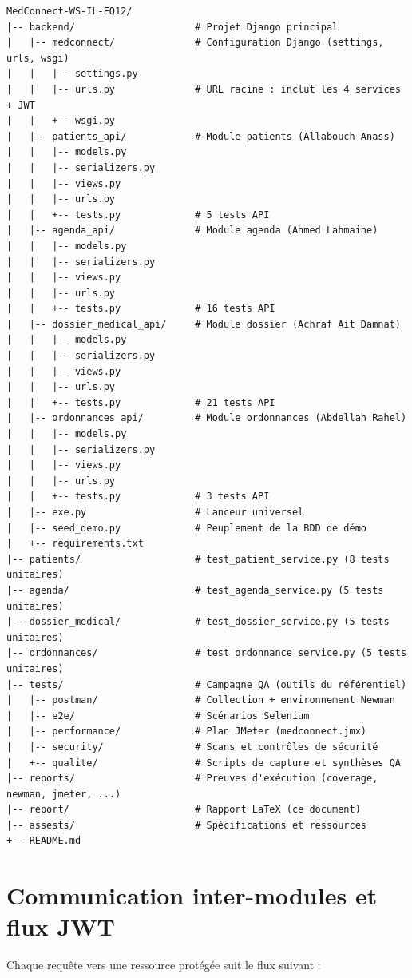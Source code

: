 \documentclass[12pt,a4paper]{report}
\begin{document}
\begin{lstlisting}
MedConnect-WS-IL-EQ12/
|-- backend/                     # Projet Django principal
|   |-- medconnect/              # Configuration Django (settings, urls, wsgi)
|   |   |-- settings.py
|   |   |-- urls.py              # URL racine : inclut les 4 services + JWT
|   |   +-- wsgi.py
|   |-- patients_api/            # Module patients (Allabouch Anass)
|   |   |-- models.py
|   |   |-- serializers.py
|   |   |-- views.py
|   |   |-- urls.py
|   |   +-- tests.py             # 5 tests API
|   |-- agenda_api/              # Module agenda (Ahmed Lahmaine)
|   |   |-- models.py
|   |   |-- serializers.py
|   |   |-- views.py
|   |   |-- urls.py
|   |   +-- tests.py             # 16 tests API
|   |-- dossier_medical_api/     # Module dossier (Achraf Ait Damnat)
|   |   |-- models.py
|   |   |-- serializers.py
|   |   |-- views.py
|   |   |-- urls.py
|   |   +-- tests.py             # 21 tests API
|   |-- ordonnances_api/         # Module ordonnances (Abdellah Rahel)
|   |   |-- models.py
|   |   |-- serializers.py
|   |   |-- views.py
|   |   |-- urls.py
|   |   +-- tests.py             # 3 tests API
|   |-- exe.py                   # Lanceur universel
|   |-- seed_demo.py             # Peuplement de la BDD de démo
|   +-- requirements.txt
|-- patients/                    # test_patient_service.py (8 tests unitaires)
|-- agenda/                      # test_agenda_service.py (5 tests unitaires)
|-- dossier_medical/             # test_dossier_service.py (5 tests unitaires)
|-- ordonnances/                 # test_ordonnance_service.py (5 tests unitaires)
|-- tests/                       # Campagne QA (outils du référentiel)
|   |-- postman/                 # Collection + environnement Newman
|   |-- e2e/                     # Scénarios Selenium
|   |-- performance/             # Plan JMeter (medconnect.jmx)
|   |-- security/                # Scans et contrôles de sécurité
|   +-- qualite/                 # Scripts de capture et synthèses QA
|-- reports/                     # Preuves d'exécution (coverage, newman, jmeter, ...)
|-- report/                      # Rapport LaTeX (ce document)
|-- assests/                     # Spécifications et ressources
+-- README.md
\end{lstlisting}

\section{Communication inter-modules et flux JWT}

Chaque requête vers une ressource protégée suit le flux suivant :
\end{document}

